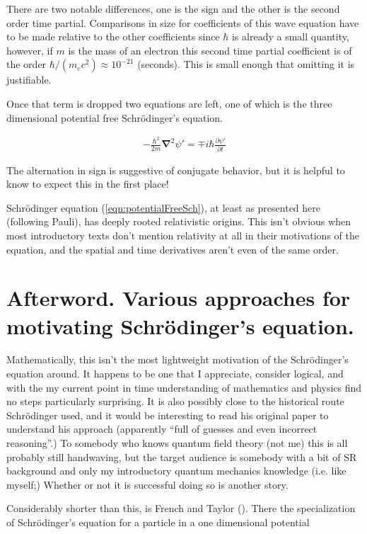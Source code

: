 \documentclass[]{eliblog}
\newcommand{\spacegrad}[0]{\boldsymbol{\nabla}}
\begin{document}
There are two notable differences, one is the sign and the other is the second order time partial.  
Comparisons in size for coefficients of this wave equation have to be made relative to the other coefficients since $\hbar$ is already a small quantity,
however, if $m$ is the mass of an electron this second time partial coefficient is of the order $\hbar/(m_e c^2) \approx 10^{-21}$ (seconds).  This is
small enough that omitting it is justifiable.

Once that term is dropped two equations are left, one of which is the three dimensional potential free Schr\"{o}dinger's equation.

\begin{align}\label{eqn:potentialFreeSch}
-\frac{\hbar^2}{2m} \spacegrad^2 \psi' = \mp i \hbar \frac{\partial \psi'}{\partial t}
\end{align}

The alternation in sign is suggestive of conjugate behavior, but it is helpful to know to expect this in the first place!

Schr\"{o}dinger equation (\ref{eqn:potentialFreeSch}), at least as presented here (following Pauli), has deeply rooted relativistic origins.
This isn't obvious when most introductory texts don't mention relativity at all in their motivations of the equation, and
the spatial and time derivatives aren't even of the same order.

\section{Afterword.  Various approaches for motivating Schr\"{o}dinger's equation.}

Mathematically, this isn't the most lightweight motivation of the Schr\"{o}dinger's equation around.  It happens to be one that I appreciate, consider
logical, and with the my current point in time understanding of mathematics and physics find no steps particularly surprising.
It is also possibly close to the historical route Schr\"{o}dinger used, and it would be interesting to read his original paper to understand his approach (apparently ``full of guesses and even incorrect reasoning''.)  To somebody who knows quantum field theory (not me) this is all probably still handwaving, but the target audience is somebody with a bit of SR background and only my introductory quantum mechanics knowledge (i.e. like myself;)  Whether or not it is successful
doing so is another story.

Considerably shorter than this, is French and Taylor (\cite{french1998iqp}).  There the specialization of Schr\"{o}dinger's equation for a particle in a one dimensional potential
\end{document}
